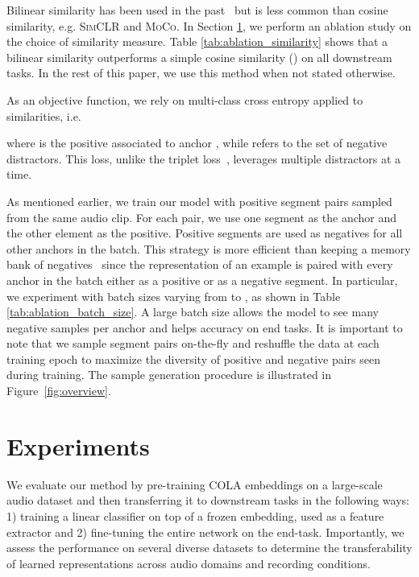 \documentclass{article}
\newcommand{\ours}{COLA }
\begin{document}
Bilinear similarity has been used in the past~\cite{oord2018representation} but is less common than cosine similarity, e.g. \textsc{SimCLR} and \textsc{MoCo}. In Section \ref{sec:experiments}, we perform an ablation study on the choice of similarity measure. Table \ref{tab:ablation_similarity} shows that a bilinear similarity outperforms a simple cosine similarity () on all downstream tasks. In the rest of this paper, we use this method when not stated otherwise.

As an objective function, we rely on multi-class cross entropy applied to similarities, i.e.

where  is the positive associated to anchor , while  refers to the set of negative distractors.
This loss, unlike the triplet loss~\cite{wang2015unsupervised}, leverages multiple distractors at a time. 

As mentioned earlier, we train our model with positive segment pairs sampled from the same audio clip. For each pair, we use one segment as the anchor and the other element as the positive. Positive segments are used as negatives for all other anchors in the batch. This strategy is more efficient than keeping a memory bank of negatives~\cite{wu2018unsupervised, he2020momentum} since the representation of an example is paired with every anchor in the batch either as a positive or as a negative segment. In particular, we experiment with batch sizes varying from  to , as shown in Table \ref{tab:ablation_batch_size}. A large batch size allows the model to see many negative samples per anchor and helps accuracy on end tasks. It is important to note that we sample segment pairs on-the-fly and reshuffle the data at each training epoch to maximize the diversity of positive and negative pairs seen during training. The sample generation procedure is illustrated in Figure~\ref{fig:overview}. 

\section{Experiments}
\label{sec:experiments}
We evaluate our method by pre-training \ours embeddings on a large-scale audio dataset and then transferring it to downstream tasks in the following ways: 1) training a linear classifier on top of a frozen embedding, used as a feature extractor and 2) fine-tuning the entire network on the end-task. Importantly, we assess the performance on several diverse datasets to determine the transferability of learned representations across audio domains and recording conditions. 
\end{document}
